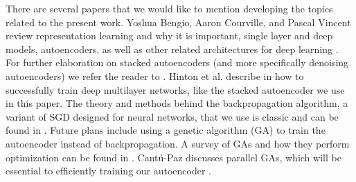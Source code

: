 There are several papers that we would like to mention developing the topics related to the present work. Yoshua Bengio, Aaron Courville, and Pascal Vincent review representation learning and why it is important, single layer and deep models, autoencoders, as well as other related architectures for deep learning \cite{bengio2012rep}. For further elaboration on stacked autoencoders (and more specifically denoising autoencoders) we refer the reader to \cite{vincent2010stacked}. Hinton et al. describe in \cite{hinton2006learning} how to successfully train deep multilayer networks, like the stacked autoencoder we use in this paper. The theory and methods behind the backpropagation algorithm, a variant of SGD designed for neural networks, that we use is classic and can be found in \cite{hecht1989theory,bottou-91c}. Future plans include using a genetic algorithm (GA) to train the autoencoder instead of backpropagation. A survey of GAs and how they perform optimization can be found in \cite{srinivas1994genetic}. Cant{\'u}-Paz discusses parallel GAs, which will be essential to efficiently training our autoencoder \cite{cantu1998survey}.


